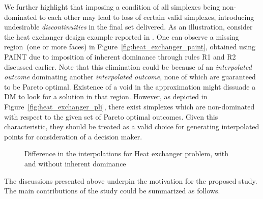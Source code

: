 {\color{blue} We further highlight that imposing a condition of all simplexes being non-dominated to each other may lead to loss of certain valid simplexes, introducing undesirable \textit{discontinuities} in the final set delivered. As an illustration, consider the heat exchanger design example reported in \cite{hartikainen2010computationally}. One can observe a missing region~(one or more faces) in  Figure~\ref{fig:heat_exchanger_paint}, obtained using PAINT due to imposition of inherent dominance through rules R1 and R2 discussed earlier. Note that this elimination could be because of an \textit{interpolated outcome} dominating another \textit{interpolated outcome}, none of which are guaranteed to be Pareto optimal. Existence of a void in the approximation might dissuade a DM to look for a solution in that region. However, as depicted in Figure~\ref{fig:heat_exchanger_pli}, there exist simplexes which are non-dominated with respect to the given set of Pareto optimal outcomes. Given this characteristic, they should be treated as a valid choice for generating interpolated points for consideration of a decision maker.}


\begin{figure}[!ht]
	\centering
	\caption{Difference in the interpolations for Heat exchanger problem, with and without inherent dominance}
	\label{fig:dtlz2_paint_pli}
\end{figure}

The discussions presented above underpin the motivation for the proposed study. The main contributions of the study could be summarized as follows. 

